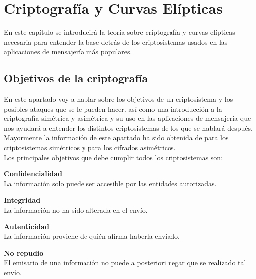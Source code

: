 \chapter{Criptografía y Curvas Elípticas}

En este capítulo se introducirá la teoría sobre criptografía y curvas elípticas necesaria para entender la base detrás de los criptosistemas usados en las aplicaciones de mensajería más populares.

\section{Objetivos de la criptografía}
En este apartado voy a hablar sobre los objetivos de un criptosistema y los posibles ataques que se le pueden hacer, así como una introducción a la criptografía simétrica y asimétrica y su uso en las aplicaciones de mensajería que nos ayudará a entender los distintos criptosistemas de los que se hablará después.
Mayormente la información de este apartado ha sido obtenida de \cite{apuntesCriptografia} para los criptosistemas simétricos y \cite{angelRiosMateos} para los cifrados asimétricos.\\
Los principales objetivos que debe cumplir todos los criptosistemas son:
\begin{description}
	\item \textbf{Confidencialidad}\\ 
		La información solo puede ser accesible por las entidades autorizadas. 
	\item \textbf{Integridad}\\ 
		La información no ha sido alterada en el envío.
	\item \textbf{Autenticidad}\\ 
		La información proviene de quién afirma haberla enviado.
	\item \textbf{No repudio}\\ 
		El emisario de una información no puede a posteriori negar que se realizado tal envío.
\end{description}

